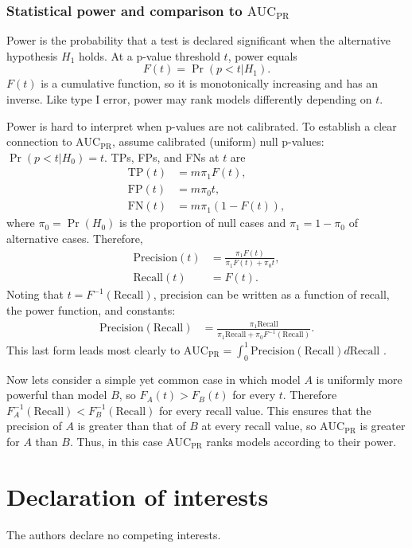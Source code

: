 \documentclass[11pt]{article}
\newcommand{\auc}{\text{AUC}_\text{PR}}
\begin{document}
\subsubsection{Statistical power and comparison to $\auc$}

Power is the probability that a test is declared significant when the alternative hypothesis $H_1$ holds.
At a p-value threshold $t$, power equals
$$
F(t) = \Pr( p < t | H_1 ).
$$
$F(t)$ is a cumulative function, so it is monotonically increasing and has an inverse.
Like type I error, power may rank models differently depending on $t$.

Power is hard to interpret when p-values are not calibrated.
To establish a clear connection to $\auc$, assume calibrated (uniform) null p-values: $\Pr( p < t | H_0 ) = t$.
TPs, FPs, and FNs at $t$ are
\begin{align*}
  \text{TP}(t)
  &=
    m \pi_1 F(t)
    , \\
  \text{FP}(t)
  &=
    m \pi_0 t
    , \\
  \text{FN}(t)
  &=
    m \pi_1 ( 1 - F(t) )
    ,
\end{align*}
where $\pi_0 = \Pr( H_0 )$ is the proportion of null cases and $\pi_1 = 1 - \pi_0$ of alternative cases.
Therefore, 
\begin{align*}
  \text{Precision}(t)
  &=
    \frac{ \pi_1 F(t) }{ \pi_1 F(t) + \pi_0 t }
    , \\
  \text{Recall}(t)
  &=
    F(t)
    .
\end{align*}
Noting that $t = F^{-1}( \text{Recall} )$, precision can be written as a function of recall, the power function, and constants:
\begin{align*}
  \text{Precision}( \text{Recall} )
  &=
    \frac{ \pi_1 \text{Recall} }{ \pi_1 \text{Recall} + \pi_0 F^{-1}( \text{Recall} ) }
    .
\end{align*}
This last form leads most clearly to
$
\auc
=
\int_0^1 \text{Precision}( \text{Recall} ) d \text{Recall}
$
.

Now lets consider a simple yet common case in which model $A$ is uniformly more powerful than model $B$, so $F_A(t) > F_B(t)$ for every $t$.
Therefore $F_A^{-1}( \text{Recall} ) < F_B^{-1}( \text{Recall} )$ for every recall value.
This ensures that the precision of $A$ is greater than that of $B$ at every recall value, so $\auc$ is greater for $A$ than $B$.
Thus, in this case $\auc$ ranks models according to their power.


\section*{Declaration of interests}
The authors declare no competing interests.
\end{document}
